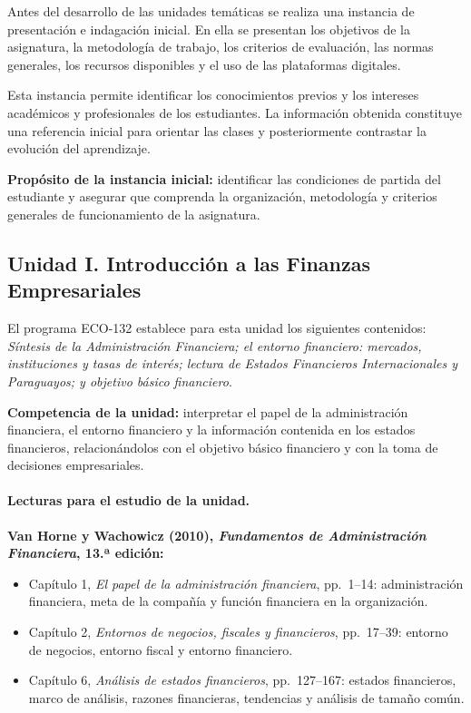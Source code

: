 \documentclass[10pt]{article}
\begin{document}
Antes del desarrollo de las unidades temáticas se realiza una instancia de
presentación e indagación inicial. En ella se presentan los objetivos de la
asignatura, la metodología de trabajo, los criterios de evaluación, las normas
generales, los recursos disponibles y el uso de las plataformas digitales.
\parencite{armoa2026planeamiento}

Esta instancia permite identificar los conocimientos previos y los intereses
académicos y profesionales de los estudiantes. La información obtenida
constituye una referencia inicial para orientar las clases y posteriormente
contrastar la evolución del aprendizaje.

\textbf{Propósito de la instancia inicial:} identificar las condiciones de
partida del estudiante y asegurar que comprenda la organización, metodología
y criterios generales de funcionamiento de la asignatura.

\subsection{Unidad I. Introducción a las Finanzas Empresariales}

El programa ECO-132 establece para esta unidad los siguientes contenidos:
\textit{Síntesis de la Administración Financiera; el entorno financiero:
mercados, instituciones y tasas de interés; lectura de Estados Financieros
Internacionales y Paraguayos; y objetivo básico financiero}.
\parencite{uaProgramaFinanzasLargoPlazo}

\textbf{Competencia de la unidad:} interpretar el papel de la administración
financiera, el entorno financiero y la información contenida en los estados
financieros, relacionándolos con el objetivo básico financiero y con la toma de
decisiones empresariales.

\paragraph{Lecturas para el estudio de la unidad.}

\textbf{Van Horne y Wachowicz (2010), \textit{Fundamentos de Administración
Financiera}, 13.ª edición:}

\begin{itemize}
    \item Capítulo 1, \textit{El papel de la administración financiera},
    pp.~1--14: administración financiera, meta de la compañía y función
    financiera en la organización.
    \item Capítulo 2, \textit{Entornos de negocios, fiscales y financieros},
    pp.~17--39: entorno de negocios, entorno fiscal y entorno financiero.
    \item Capítulo 6, \textit{Análisis de estados financieros},
    pp.~127--167: estados financieros, marco de análisis, razones financieras,
    tendencias y análisis de tamaño común.
\end{itemize}
\parencite{vanhorne2010fundamentos}
\end{document}
